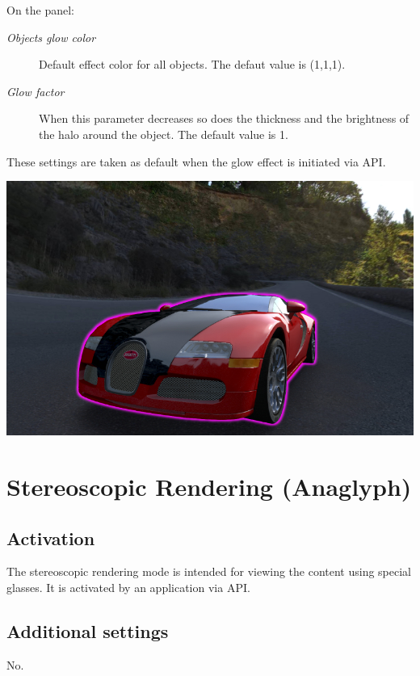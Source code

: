 \documentclass[a4paper,12pt,oneside]{sphinxmanual}
\begin{document}
On the  panel:
\begin{description}
\item[{\emph{Objects glow color}}] \leavevmode
Default effect color for all objects. The defaut value is (1,1,1).

\item[{\emph{Glow factor}}] \leavevmode
When this parameter decreases so does the thickness and the brightness of the halo around the object. The default value is 1.

\end{description}

These settings are taken as default when the glow effect is initiated via API.

{\hfill\includegraphics[width=1.000\linewidth]{glow.jpg}\hfill}


\section{Stereoscopic Rendering (Anaglyph)}
\label{postprocessing_effects:anaglyph}\label{postprocessing_effects:index-5}\label{postprocessing_effects:id20}

\subsection{Activation}
\label{postprocessing_effects:id21}
The stereoscopic rendering mode is intended for viewing the content using special glasses. It is activated by an application via API.


\subsection{Additional settings}
\label{postprocessing_effects:id22}
No.
\end{document}
